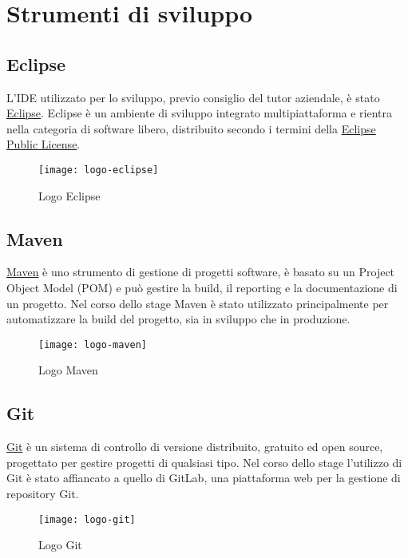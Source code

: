 \newpage
\section{Strumenti di sviluppo}

\subsection{Eclipse}
\label{eclipse}
L'IDE utilizzato per lo sviluppo, previo consiglio del tutor aziendale, è stato \href{https://www.eclipse.org/}{Eclipse}.
Eclipse è un ambiente di sviluppo integrato multipiattaforma e rientra nella categoria di software libero, distribuito secondo i termini della \href{https://www.eclipse.org/legal/epl-2.0/}{Eclipse Public License}.
\begin{figure}[h]
    \begin{center}
    \texttt{[image: logo-eclipse]}
    \caption{Logo Eclipse}
    \label{fig:figure10}
    \end{center}
\end{figure}

\subsection{Maven}
\label{maven}
\href{https://maven.apache.org/}{Maven} è uno strumento di gestione di progetti software, è basato su un Project Object Model (POM) e può gestire la build, il reporting e la documentazione di un progetto. Nel corso dello stage Maven è stato utilizzato principalmente per automatizzare la build del progetto, sia in sviluppo che in produzione.
\begin{figure}[h]
    \begin{center}
    \texttt{[image: logo-maven]}
    \caption{Logo Maven}
    \label{fig:figure11}
    \end{center}
\end{figure}

\subsection{Git}
\label{git}
\href{https://git-scm.com/}{Git} è un sistema di controllo di versione distribuito, gratuito ed open source, progettato per gestire progetti di qualsiasi tipo. Nel corso dello stage l'utilizzo di Git è stato affiancato a quello di GitLab, una piattaforma web per la gestione di repository Git.
\begin{figure}[h]
    \begin{center}
    \texttt{[image: logo-git]}
    \caption{Logo Git}
    \label{fig:figure12}
    \end{center}
\end{figure}
